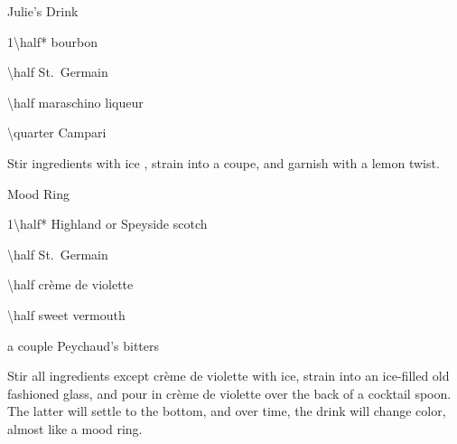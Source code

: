 \begin{Cocktail*}{Julie's Drink} %
	\begin{Ingredients}
	\item \SI{1\half*}{\oz} bourbon
	\item \SI{\half}{\oz} St.\ Germain
	\item \SI{\half}{\oz} maraschino liqueur%
	\item \SI{\quarter}{\oz} Campari
	\end{Ingredients}
	
	\begin{Instructions}
	Stir ingredients with ice%
	, strain into a coupe, and garnish with a lemon twist.
	\end{Instructions}
\end{Cocktail*}

\begin{Cocktail*}{Mood Ring} %
	\begin{Ingredients}
	\item \SI{1\half*}{\oz} Highland or Speyside scotch
	\item \SI{\half}{\oz} St.\ Germain
	\item \SI{\half}{\oz} cr\`eme de violette
	\item \SI{\half}{\oz} sweet vermouth
	\item a couple \si{\dashes} Peychaud's bitters
	\end{Ingredients}
	
	\begin{Instructions}\small
	Stir all ingredients except cr\`eme de violette with ice, strain into an ice-filled old fashioned glass, and pour in cr\`eme de violette over the back of a cocktail spoon.  The latter will settle to the bottom, and over time, the drink will change color, almost like a mood ring.
	\end{Instructions}
\end{Cocktail*}

